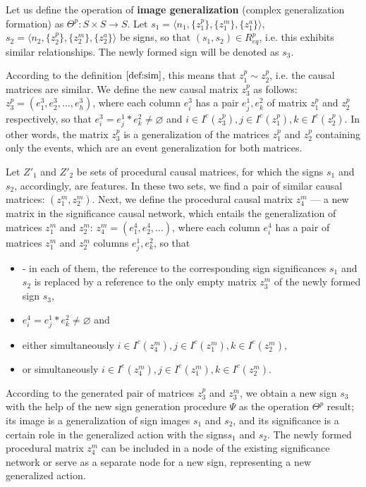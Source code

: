 \documentclass[review]{elsarticle}
\begin{document}
Let us define the operation of \textbf{image generalization} (complex generalization formation) as $\Theta^p: S\times S\rightarrow S$. Let $s_1=\langle n_1, \{z_1^p\}, \{z_1^m\}, \{z_1^a\} \rangle$, $s_2=\langle n_2, \{z_2^p\}, \{z_2^m\}, \{z_2^a\} \rangle$ be signs, so that $(s_1,s_2)\in R_{eq}^p$, i.e. this exhibits similar relationships. The newly formed sign will be denoted as $s_3$.

According to the definition $\autoref{def:sim}$, this means that $z_1^p\sim z_2^p$, i.e. the causal matrices are similar. We define the new causal matrix $z_3^p$ as follows: $z_3^p=(e_1^3,e_2^3,\dots,e_h^3)$, where each column $e_i^3$ has a pair $e_j^1, e_k^2$ of matrix $z_1^p$ and $z_2^p$ respectively, so that $e_i^3=e_j^1*e_k^2\not=\varnothing$ and $i\in I^c(z_3^p), j\in I^c(z_1^p), k\in I^c(z_2^p)$. In other words, the matrix $z_3^p$ is a generalization of the matrices $z_1^p$ and $z_2^p$ containing only the events, which are an event generalization for both matrices.

Let $Z'_1$ and $Z'_2$ be sets of procedural causal matrices, for which the signs $s_1$ and $s_2$, accordingly, are features. In these two sets, we find a pair of similar causal matrices: $(z_1^m,z_2^m)$. Next, we define the procedural causal matrix $z_4^m$ --- a new matrix in the significance causal network, which entails the generalization of matrices $z_1^m$ and $z_2^m$: $z_4^m=(e_1^4,e_2^4,\dots)$, where each column $e_i^4$ has a pair of matrices $z_1^m$ and $z_2^m$ columns $e_j^1, e_k^2$, so that
\begin{itemize}
	\item -	in each of them, the reference to the corresponding sign significances $s_1$ and $s_2$ is replaced by a reference to the only empty matrix $z_3^m$ of the newly formed sign $s_3$,
	\item $e_i^4=e_j^1*e_k^2\not=\varnothing$ and 
	\item either simultaneously $i\in I^c(z_4^m), j\in I^c(z_1^m), k\in I^c(z_2^m)$, 
	\item or simultaneously  $i\in I^e(z_4^m), j\in I^e(z_1^m), k\in I^c(z_2^m)$.
\end{itemize}

According to the generated pair of matrices $z_3^p$ and $z_3^m$, we obtain a new sign $s_3$ with the help of the new sign generation procedure $\Psi$ as the operation $\Theta^p$ result; its image is a generalization of sign images $s_1$ and $s_2$, and its significance is a certain role in the generalized action with the signs$s_1$ and $s_2$. The newly formed procedural matrix $z_4^m$ can be included in a node of the existing significance network or serve as a separate node for a new sign, representing a new generalized action.
\end{document}
